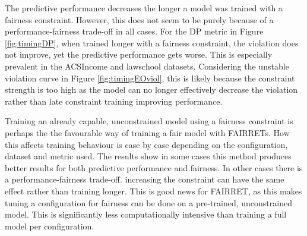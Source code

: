 The predictive performance decreases the longer a model was trained with a fairness constraint. However, this does not seem to be purely because of a performance-fairness trade-off in all cases. For the DP metric in Figure \ref{fig:timingDP}, when trained longer with a fairness constraint, the violation does not improve, yet the predictive performance gets worse. This is especially prevalent in the ACSIncome and lawschool datasets. Considering the unstable violation curve in Figure \ref{fig:timingEOviol}, this is likely because the constraint strength is too high as the model can no longer effectively decrease the violation rather than late constraint training improving performance.

Training an already capable, unconstrained model using a fairness constraint is perhaps the the favourable way of training a fair model with FAIRRETs. How this affects training behaviour is case by case depending on the configuration, dataset and metric used. The results show in some cases this method produces better results for both predictive performance and fairness. In other cases there is a performance-fairness trade-off. increasing the constraint can have the same effect rather than training longer. This is good news for FAIRRET, as this makes tuning a configuration for fairness can be done on a pre-trained, unconstrained model. This is significantly less computationally intensive than training a full model per configuration.